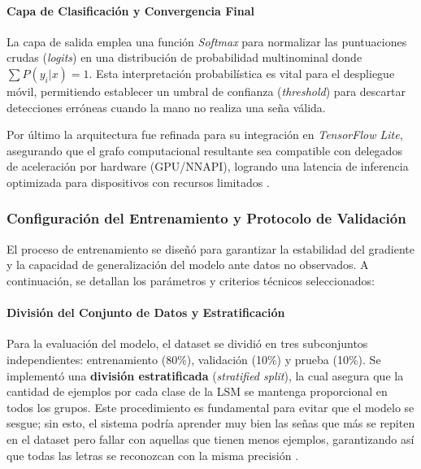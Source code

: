 	\paragraph{Capa de Clasificación y Convergencia Final}
	La capa de salida emplea una función \textit{Softmax} para normalizar las puntuaciones crudas (\textit{logits}) en una distribución de probabilidad multinominal donde $\sum P(y_i|x) = 1$. Esta interpretación probabilística es vital para el despliegue móvil, permitiendo establecer un umbral de confianza (\textit{threshold}) para descartar detecciones erróneas cuando la mano no realiza una seña válida. 
	
	Por último la arquitectura fue refinada para su integración en \textit{TensorFlow Lite}, asegurando que el grafo computacional resultante sea compatible con delegados de aceleración por hardware (GPU/NNAPI), logrando una latencia de inferencia optimizada para dispositivos con recursos limitados \cite{TensorFlowLite2024}.
	
	\subsubsection{Configuración del Entrenamiento y Protocolo de Validación}
	
	El proceso de entrenamiento se diseñó para garantizar la estabilidad del gradiente y la capacidad de generalización del modelo ante datos no observados. A continuación, se detallan los parámetros y criterios técnicos seleccionados:
	
	\paragraph{División del Conjunto de Datos y Estratificación}
	Para la evaluación del modelo, el dataset se dividió en tres subconjuntos independientes: entrenamiento (80\%), validación (10\%) y prueba (10\%). Se implementó una \textbf{división estratificada} (\textit{stratified split}), la cual asegura que la cantidad de ejemplos por cada clase de la LSM se mantenga proporcional en todos los grupos. Este procedimiento es fundamental para evitar que el modelo se sesgue; sin esto, el sistema podría aprender muy bien las señas que más se repiten en el dataset pero fallar con aquellas que tienen menos ejemplos, garantizando así que todas las letras se reconozcan con la misma precisión \cite{Geron2022HandsOnML}.
	
